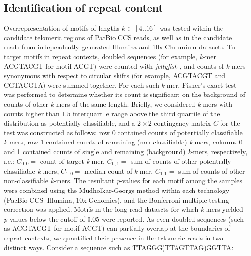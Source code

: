 \documentclass{article}
\begin{document}
\subsection*{Identification of repeat content}
    Overrepresentation of motifs of lengths $k \subset [4 .. 16]$ was tested within the candidate telomeric regions of PacBio CCS reads,
        as well as in the candidate reads from independently generated Illumina and 10x Chromium datasets.
    To target motifs in repeat contexts,
        doubled sequences (for example, \textit{k}-mer ACGTACGT for motif ACGT) were counted with \textit{jellyfish} \parencite{jellyfish},
        and counts of \textit{k}-mers synonymous with respect to circular shifts (for example, ACGTACGT and CGTACGTA) were summed together.
    For each such \textit{k}-mer,
        Fisher's exact test was performed to determine whether its count is significant
            on the background of counts of other \textit{k}-mers of the same length.
    Briefly, we considered \textit{k}-mers with counts higher than 1.5 interquartile range above the third quartile of the distribution
        as potentially classifiable,
        and a $ 2 \times{} 2 $ contingency matrix $ C $ for the test was constructed as follows:
        row 0 contained counts of potentially classifiable \textit{k}-mers,
        row 1 contained counts of remaining (non-classifiable) \textit{k}-mers,
        columns 0 and 1 contained counts of single and remaining (background) \textit{k}-mers, respectively,
            i.e.:
                $ C_{0,0} = $ {\rmfamily count of target \textit{k}-mer},
                $ C_{0,1} = $ {\rmfamily sum of counts of other potentially classifiable \textit{k}-mers},
                $ C_{1,0} = $ {\rmfamily median count of \textit{k}-mer},
                $ C_{1,1} = $ {\rmfamily sum of counts of other non-classifiable \textit{k}-mers}.
    The resultant \textit{p}-values for each motif among the samples were combined using the Mudholkar-George method \parencite{george}
        within each technology (PacBio CCS, Illumina, 10x Genomics),
        and the Bonferroni multiple testing correction was applied.
    Motifs in the long-read datasets for which \textit{k}-mers yielded \textit{p}-values below the cutoff of 0.05 were reported.
    As even doubled sequences (such as ACGTACGT for motif ACGT) can partially overlap at the boundaries of repeat contexts,
        we quantified their presence in the telomeric reads in two distinct ways.
        Consider a sequence such as TTAGGG(\underline{TTAGTTAG})GGTTA:
\end{document}
